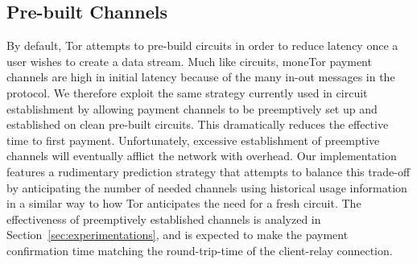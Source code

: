 
%
%

\subsection{Pre-built Channels}
By default, Tor attempts to pre-build circuits in order to reduce latency once a
user wishes to create a data stream. Much like circuits, moneTor payment
channels are high in initial latency because of the many in-out messages in the
protocol. We therefore exploit the same strategy currently used in circuit
establishment by allowing payment channels to be preemptively set up and
established on clean pre-built circuits. This dramatically reduces the effective
time to first payment. Unfortunately, excessive establishment of preemptive
channels will eventually afflict the network with overhead. Our
implementation features a rudimentary prediction strategy that attempts to
balance this trade-off by anticipating the number of needed channels using
historical usage information in a similar way to how Tor anticipates the need for a
fresh circuit. The effectiveness of preemptively established channels is analyzed
in Section~\ref{sec:experimentations}, and is expected to make the payment
confirmation time matching the round-trip-time of the client-relay connection.


